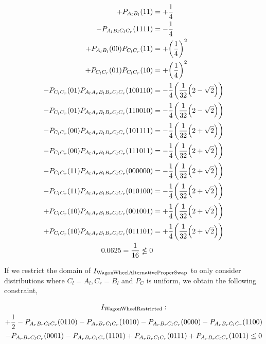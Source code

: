 \documentclass[aps, 10pt, english, twoside, pra, nofootinbib, tightenlines, longbibliography, superscriptaddress]{revtex4-1}
\begin{document}
    \begin{align*}
        +P_{A_{l}B_{l}}(11) &= +\f{1}{4}\\
        -P_{A_{l}B_{l}C_{l}C_{r}}(1111) &= -\f{1}{4}\\
        +P_{A_{l}B_{l}}(00) P_{C_{l}C_{r}}(11) &= +\br{\f{1}{4}}^2 \\
        +P_{C_{l}C_{r}}(01) P_{C_{l}C_{r}}(10) &= +\br{\f{1}{4}}^2 \\
        -P_{C_{l}C_{r}}(01) P_{A_{l}A_{r}B_{l}B_{r}C_{l}C_{r}}(100110) &= -\f{1}{4}\br{\f{1}{32}\br{2 - \sqrt{2}}} \\
        -P_{C_{l}C_{r}}(01) P_{A_{l}A_{r}B_{l}B_{r}C_{l}C_{r}}(110010) &= -\f{1}{4}\br{\f{1}{32}\br{2 - \sqrt{2}}} \\
        -P_{C_{l}C_{r}}(00) P_{A_{l}A_{r}B_{l}B_{r}C_{l}C_{r}}(101111) &= -\f{1}{4}\br{\f{1}{32}\br{2 + \sqrt{2}}} \\
        -P_{C_{l}C_{r}}(00) P_{A_{l}A_{r}B_{l}B_{r}C_{l}C_{r}}(111011) &= -\f{1}{4}\br{\f{1}{32}\br{2 + \sqrt{2}}} \\
        -P_{C_{l}C_{r}}(11) P_{A_{l}A_{r}B_{l}B_{r}C_{l}C_{r}}(000000) &= -\f{1}{4}\br{\f{1}{32}\br{2 + \sqrt{2}}} \\
        -P_{C_{l}C_{r}}(11) P_{A_{l}A_{r}B_{l}B_{r}C_{l}C_{r}}(010100) &= -\f{1}{4}\br{\f{1}{32}\br{2 + \sqrt{2}}} \\
        +P_{C_{l}C_{r}}(10) P_{A_{l}A_{r}B_{l}B_{r}C_{l}C_{r}}(001001) &= +\f{1}{4}\br{\f{1}{32}\br{2 + \sqrt{2}}} \\
        +P_{C_{l}C_{r}}(10) P_{A_{l}A_{r}B_{l}B_{r}C_{l}C_{r}}(011101) &= +\f{1}{4}\br{\f{1}{32}\br{2 + \sqrt{2}}} \\
        0.0625 = \f{1}{16} \nleq 0
    \end{align*}

    If we restrict the domain of $I_\text{WagonWheelAlternativeProperSwap}$ to only consider distributions where $C_{l} = A_{l}, C_{r} = B_{l}$ and $P_{C}$ is uniform, we obtain the following constraint,

    \begin{equation*}
    \begin{gathered}
        I_\text{WagonWheelRestricted} : \\
        + \frac{1}{2} - P_{A_{r}B_{r}C_{l}C_{r}}(0110) - P_{A_{r}B_{r}C_{l}C_{r}}(1010) - P_{A_{r}B_{r}C_{l}C_{r}}(0000) - P_{A_{r}B_{r}C_{l}C_{r}}(1100) \\
        - P_{A_{r}B_{r}C_{l}C_{r}}(0001) - P_{A_{r}B_{r}C_{l}C_{r}}(1101) + P_{A_{r}B_{r}C_{l}C_{r}}(0111) + P_{A_{r}B_{r}C_{l}C_{r}}(1011)  \leq 0
    \end{gathered}
    \end{equation*}
\end{document}
